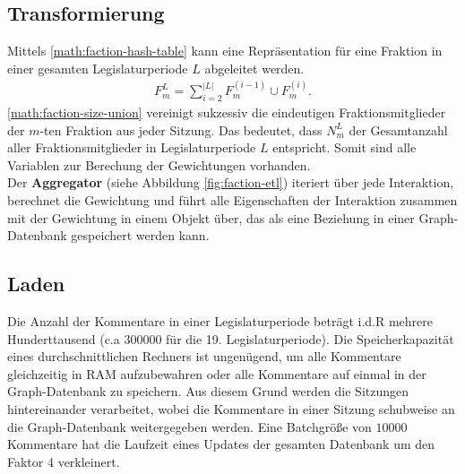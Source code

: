 \subsection{Transformierung}
Mittels \ref{math:faction-hash-table} kann eine Repräsentation für eine Fraktion in einer gesamten Legislaturperiode $L$ abgeleitet werden.
\begin{equation}
    \begin{aligned}
    \label{math:faction-size-union}
    F_{m}^{L} = \sum_{i = 2}^{|L|} F_{m}^{(i-1)} \cup F_{m}^{(i)}.
    \end{aligned}
\end{equation}
\ref{math:faction-size-union} vereinigt sukzessiv die eindeutigen Fraktionsmitglieder der $m$-ten Fraktion aus jeder Sitzung. Das bedeutet, dass $N_m^{L}$ der Gesamtanzahl
aller Fraktionsmitglieder in Legislaturperiode $L$ entspricht. Somit sind alle Variablen zur Berechung der Gewichtungen vorhanden.\\
Der \textbf{Aggregator} (siehe Abbildung \ref{fig:faction-etl}) iteriert über jede Interaktion, berechnet die Gewichtung und führt alle Eigenschaften der
Interaktion zusammen mit der Gewichtung in einem Objekt über, das als eine Beziehung in einer Graph-Datenbank gespeichert werden kann. 
\subsection{Laden}
Die Anzahl der Kommentare in einer Legislaturperiode beträgt i.d.R mehrere Hunderttausend (c.a $300 000$ für die 19. Legislaturperiode). 
Die Speicherkapazität eines durchschnittlichen Rechners ist ungenügend, um alle Kommentare gleichzeitig in RAM aufzubewahren oder alle Kommentare auf einmal 
in der Graph-Datenbank zu speichern. Aus diesem Grund werden die Sitzungen hintereinander verarbeitet, wobei die Kommentare in einer Sitzung schubweise 
an die Graph-Datenbank weitergegeben werden. Eine Batchgröße von $10 000$ Kommentare hat die Laufzeit eines Updates der gesamten Datenbank um den Faktor 4 verkleinert.

